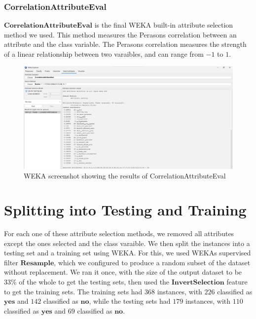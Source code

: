\documentclass[12pt]{article}
\begin{document}
\newpage
\subsubsection{CorrelationAttributeEval}
$\textbf{CorrelationAttributeEval}$ is the final WEKA built-in attribute selection method we used. This method measures the Perason\textquotesingle s correlation between an attribute and the class variable. The Perason\textquotesingle s correlation measures the strength of a linear relationship between two varaibles, and can range from $-1$ to $1$. 
\begin{figure}[h!]
    \includegraphics[scale=0.4]{./images/CorrelationAttributeEval/CorrelationAttributeEval.png}
    \centering
    \caption{WEKA screenshot showing the results of CorrelationAttributeEval}
    \label{fig:Correlation}
\end{figure}

\section{Splitting into Testing and Training}
For each one of these attribute selection methods, we removed all attributes except the ones selected and the class varaible. We then split the instances into a testing set and a training set using WEKA. For this, we used WEKA\textquotesingle s supervised filter $\textbf{Resample}$, which we configured to produce a random subset of the dataset without replacement. We ran it once, with the size of the output dataset to be 33\% of the whole to get the testing sets, then used the $\textbf{InvertSelection}$ feature to get the training sets. The training sets had $368$ instances, with $226$ classified as $\textbf{yes}$ and $142$ classified as $\textbf{no}$, while the testing sets had $179$ instances, with $110$ classified as $\textbf{yes}$ and $69$ classified as $\textbf{no}$.
\end{document}

